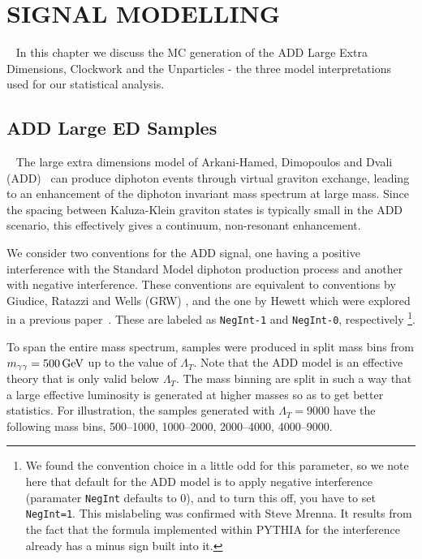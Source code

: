 \chapter{SIGNAL MODELLING}~\label{ch:SignalModelling}
\RaggedRight \parindent=25pt
In this chapter we discuss the MC generation of the ADD Large Extra Dimensions, Clockwork and the Unparticles - the three model interpretations used for our statistical analysis. 

\section{ADD Large ED Samples}~\label{subsec:MC_Signal_ADD}
The large extra dimensions model of Arkani-Hamed, Dimopoulos and Dvali
(ADD)~\cite{Arkani-Hamed:1998jmv, Arkani-Hamed:1998sfv} can produce diphoton events through virtual graviton exchange, leading to an enhancement of the diphoton invariant mass spectrum at large mass. Since the spacing between
Kaluza-Klein graviton states is typically small in the ADD scenario,
this effectively gives a continuum, non-resonant
enhancement.


We consider two conventions for the ADD signal, one having a positive interference with the Standard Model diphoton production process and another with negative interference. These conventions are equivalent to conventions by Giudice, Ratazzi and Wells (GRW) \cite{Giudice:1998ck}, and the one by Hewett \cite{Hewett:1998sn} which were explored in a previous paper~\cite{cmsdiphoton2016}. These are labeled as \texttt{NegInt-1} and \texttt{NegInt-0}, respectively \footnote{We found the convention choice in \PYTHIA a little odd for this parameter, so we note here that \PYTHIA default for the ADD model is to apply negative interference (paramater \texttt{NegInt} defaults to 0), and to turn this off, you have to set \texttt{NegInt=1}. This mislabeling was confirmed with Steve Mrenna. It results from the fact that the formula implemented within PYTHIA for the interference already has a minus sign built into it.}.

To span the entire mass spectrum, samples were produced in split mass bins from $m_{\gamma\gamma} = 500\,\text{Ge\hspace{-.08em}V}$ up to the value of $\Lambda_T$. Note that the ADD model is an effective theory that is only valid below $\Lambda_T$. The mass binning are split in such a way that a large effective luminosity is generated at higher masses so as to get better statistics. For illustration, the samples generated with $\Lambda_T = 9000$ have the following mass bins, 500--1000, 1000--2000, 2000--4000, 4000--9000.


